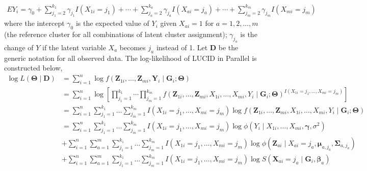 \begin{equation}
    \begin{aligned}
E Y_{i}=\gamma_{0}+\sum_{j_{1}=2}^{k_{1}} \gamma_{j_{1}} I\left(X_{1 i}=j_{1}\right)+\cdots+\sum_{j_{a}=2}^{k_{a}} \gamma_{j_{a}} I\left(X_{a i}=j_{a}\right)+\cdots+\sum_{j_{m}=2}^{k_{m}} \gamma_{j_{m}} I\left(X_{m i}=j_{m}\right)
\end{aligned}
    \label{eq_24}
\end{equation}
where the intercept $\gamma_{0}$ is the expected value of $Y_{i}$ given $X_{a i}=1$ for $a=1,2, \ldots, m$ (the reference cluster for all combinations of latent cluster assignment); $\gamma_{j_{a}}$ is the change of $Y$ if the latent variable $X_{a}$ becomes $j_{a}$ instead of 1. 
Let $\boldsymbol{D}$ be the generic notation for all observed data. The log-likelihood of LUCID in Parallel is constructed below,
\begin{equation}
   \begin{aligned}
\log L(\bm{\Theta}\mid \boldsymbol{D}) &  =\sum_{i=1}^{n} \log f\left(\boldsymbol{Z}_{1 i}, \ldots, \boldsymbol{Z}_{m i}, \boldsymbol{Y}_{i} \mid \boldsymbol{G}_{i} ; \boldsymbol{\Theta}\right) \\
& =\sum_{i=1}^{n} \log \left[\prod_{j_{1}=1}^{k_{1}} \cdots \prod_{j_{m}=1}^{k_{m}} f\left(\boldsymbol{Z}_{1 i}, \ldots, \boldsymbol{Z}_{m i}, X_{1 i}, \ldots, X_{m i}, Y_{i} \mid \boldsymbol{G}_{i} ; \boldsymbol{\Theta}\right)^{I\left(X_{1 i}=j_{1}, \ldots, X_{m i}=j_{m}\right)}\right] \\
& =\sum_{i=1}^{n} \sum_{j_{1}=1}^{k_{1}} \ldots \sum_{j_{m}=1}^{k_{m}} I\left(X_{1 i}=j_{1}, \ldots, X_{m i}=j_{m}\right) \log f\left(\boldsymbol{Z}_{1 i}, \ldots, \boldsymbol{Z}_{m i}, X_{1 i}, \ldots, X_{m i}, Y_{i} \mid \boldsymbol{G}_{i} ; \boldsymbol{\Theta}\right) \\
& =\sum_{i=1}^{n} \sum_{j_{1}=1}^{k_{1}} \ldots \sum_{j_{m}=1}^{k_{m}} I\left(X_{1 i}=j_{1}, \ldots, X_{m i}=j_{m}\right) \log \phi\left(Y_{i} \mid X_{1 i}, \ldots, X_{m i}, \boldsymbol{\gamma}, \sigma^{2}\right) \\
& +\sum_{i=1}^{n} \sum_{a=1}^{m} \sum_{j_{1}=1}^{k_{1}} \ldots \sum_{j_{m}=1}^{k_{m}} I\left(X_{1 i}=j_{1}, \ldots, X_{m i}=j_{m}\right) \log \phi\left(\boldsymbol{Z}_{a i} \mid X_{a i}=j_{a}, \boldsymbol{\mu}_{a, j_{a}}, \boldsymbol{\Sigma}_{a, j_{a}}\right) \\
& +\sum_{i=1}^{n} \sum_{a=1}^{m} \sum_{j_{1}=1}^{k_{1}} \ldots \sum_{j_{m}=1}^{k_{m}} I\left(X_{1 i}=j_{1}, \ldots, X_{m i}=j_{m}\right) \log S\left(\boldsymbol{X}_{a i}=j_{a} \mid \boldsymbol{G}_{i}, \boldsymbol{\beta}_{a}\right)
\end{aligned}
    \label{eq_26}
\end{equation}
